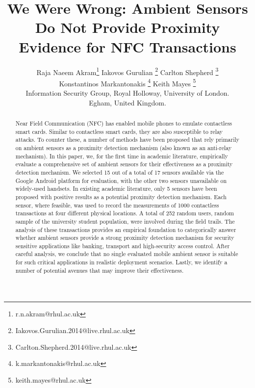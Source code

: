 \documentclass{article}
\begin{document}
\title{We Were Wrong: Ambient Sensors Do Not Provide Proximity Evidence for NFC Transactions}


\author{Raja Naeem Akram\thanks{r.n.akram@rhul.ac.uk}\qquad 
Iakovos Gurulian \thanks{Iakovos.Gurulian.2014@live.rhul.ac.uk} \qquad
Carlton Shepherd  \thanks{Carlton.Shepherd.2014@live.rhul.ac.uk} \\
Konstantinos Markantonakis \thanks{k.markantonakis@rhul.ac.uk} \qquad
Keith Mayes \thanks{keith.mayes@rhul.ac.uk}\\
Information Security Group, Royal Holloway, University of London.\\ 
Egham, United Kingdom. 
}


\maketitle
\thispagestyle{empty}

\begin{abstract}
Near Field Communication (NFC) has enabled mobile phones to emulate contactless smart cards. Similar to contactless smart cards, they are also susceptible to relay attacks.  To counter these, a number of methods have been proposed that rely primarily on ambient sensors as a proximity detection mechanism (also known as an anti-relay mechanism). In this paper, we, for the first time in academic literature, empirically evaluate a comprehensive set of ambient sensors for their effectiveness as a proximity detection mechanism.  We selected 15 out of a total of 17 sensors available via the Google Android platform for evaluation, with the other two sensors unavailable on widely-used handsets.  In existing academic literature, only 5 sensors have been proposed with positive results as a potential proximity detection mechanism.  Each sensor, where feasible, was used to record the measurements of 1000 contactless transactions at four different physical locations. A total of 252 random users, random sample of the university student population, were involved during the field trails. The analysis of these transactions provides an empirical foundation to categorically answer whether ambient sensors provide a strong proximity detection mechanism for security sensitive applications like banking, transport and high-security access control.  After careful analysis, we conclude that no single evaluated mobile ambient sensor is suitable for such critical applications in realistic deployment scenarios.  Lastly, we identify a number of potential avenues that may improve their effectiveness.
\end{abstract}
\end{document}
